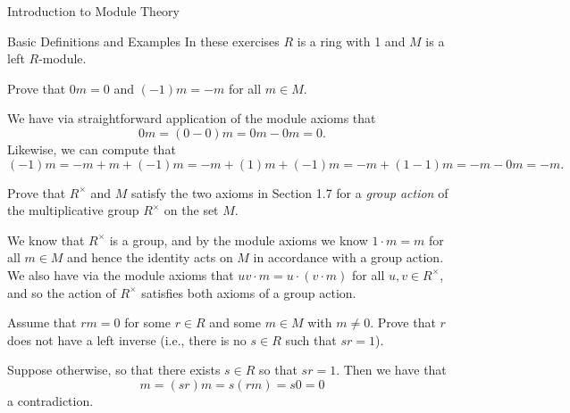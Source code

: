 \setcounter{chapter}{9}
\begin{chapter}{Introduction to Module Theory}

\begin{section}{Basic Definitions and Examples}
In these exercises $R$ is a ring with 1 and $M$ is a left $R$-module.
\begin{problem}\label{ex:10.1.1}
Prove that $0m = 0$ and $(-1)m = -m$ for all $m\in M$. 
\end{problem}
\begin{solution}We have via straightforward application of the module axioms that \[
0m = (0-0)m = 0m-0m = 0.
\]
Likewise, we can compute that \[
(-1)m = -m+m+(-1)m =  -m + (1)m + (-1)m = -m +(1-1)m = -m-0m = -m.
\]

\end{solution}\oneperpage



\begin{problem}\label{ex:10.1.2}
Prove that $R^\times$ and $M$ satisfy the two axioms in Section 1.7 for a \emph{group action} of the multiplicative group $R^\times$ on the set $M$.
\end{problem}
\begin{solution}We know that $R^\times$ is a group, and by the module axioms we know $1\cdot m = m$ for all $m\in M$ and hence the identity acts on $M$ in accordance with a group action. We also have via the module axioms that $uv\cdot m = u\cdot(v\cdot m)$ for all $u,v\in R^\times$, and so the action of $R^\times$ satisfies both axioms of a group action.

\end{solution}\oneperpage



\begin{problem}\label{ex:10.1.3}
Assume that $rm=0$ for some $r\in R$ and some $m\in M$ with $m\neq 0$. Prove that $r$ does not have a left inverse (i.e., there is no $s\in R$ such that $sr = 1$).
\end{problem}
\begin{solution}Suppose otherwise, so that there exists $s\in R$ so that $sr=1$. Then we have that \[
m = (sr)m = s(rm) = s0 = 0
\]
a contradiction. 
\end{solution}\oneperpage




\end{section}
\end{chapter}
